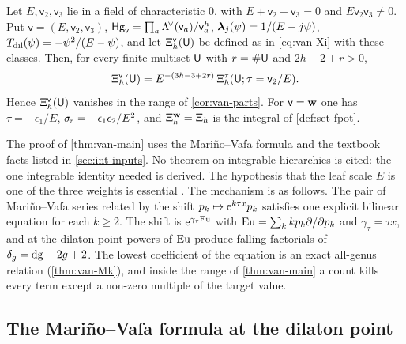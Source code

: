 \begin{cor}[{\Lg{Corollary~8.4}}]\label{cor:van-scale}
Let $E,\mathsf{v}_2,\mathsf{v}_3$ lie in a field of characteristic $0$, with $E+\mathsf{v}_2+\mathsf{v}_3=0$ and $E\mathsf{v}_2\mathsf{v}_3\neq 0$. Put $\mathsf{v}=(E,\mathsf{v}_2,\mathsf{v}_3)$, $\mathsf{Hg}_{\mathsf{v}}=\prod_a\Lambda^{\!\vee}(\mathsf{v}_a)/\mathsf{v}_a^h$, $\boldsymbol{\lambda}_j(\psi)=1/(E-j\psi)$, $T_{\mathrm{dil}}(\psi)=-\psi^2/(E-\psi)$, and let $\Xi^{\mathsf{v}}_h(\mathsf{U})$ be defined as in \eqref{eq:van-Xi} with these classes. Then, for every finite multiset $\mathsf{U}$ with $r=\#\mathsf{U}$ and $2h-2+r>0$,
\begin{equation}\label{eq:van-scale}
\Xi^{\mathsf{v}}_h(\mathsf{U})=E^{-(3h-3+2r)}\,\Xi^{\tau}_h(\mathsf{U};\tau=\mathsf{v}_2/E).
\end{equation}
Hence $\Xi^{\mathsf{v}}_h(\mathsf{U})$ vanishes in the range of \cref{cor:van-parts}. For $\mathsf{v}=\mathbf{w}$ one has $\tau=-\epsilon_1/E$, $\sigma_{\!\tau}=-\epsilon_1\epsilon_2/E^2$, and $\Xi^{\mathbf{w}}_h=\Xi_h$ is the integral of \cref{def:set-fpot}.
\end{cor}

The proof of \cref{thm:van-main} uses the Mari\~no--Vafa formula \cite[eq.~(1)--(3)]{LLZ03} and the textbook facts listed in \cref{sec:int-inputs}. No theorem on integrable hierarchies is cited: the one integrable identity needed is derived. The hypothesis that the leaf scale $E$ is one of the three weights is essential . The mechanism is as follows. The pair of Mari\~no--Vafa series related by the shift $p_k\mapsto\mathrm{e}^{k\tau x}p_k$ satisfies one explicit bilinear equation for each $k\geq 2$. The shift is $\mathrm{e}^{\gamma_\tau\mathrm{Eu}}$ with $\mathrm{Eu}=\sum_k kp_k\partial/\partial p_k$ and $\gamma_\tau=\tau x$, and at the dilaton point powers of $\mathrm{Eu}$ produce falling factorials of $\delta_g=\mathrm{dg}-2g+2$. The lowest coefficient of the equation is an exact all-genus relation (\cref{thm:van-Mk}), and inside the range of \cref{thm:van-main} a count kills every term except a non-zero multiple of the target value.

\subsection{The Mari\~no--Vafa formula at the dilaton point}
\label{sec:van-MV}


